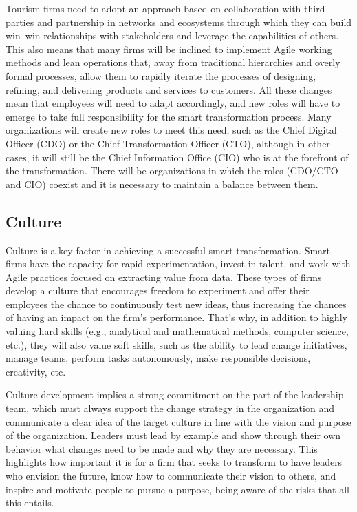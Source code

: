 \documentclass[
  letterpaper,
  DIV=11,
  numbers=noendperiod]{scrreprt}
\begin{document}
Tourism firms need to adopt an approach based on collaboration with
third parties and partnership in networks and ecosystems through which
they can build win--win relationships with stakeholders and leverage the
capabilities of others. This also means that many firms will be inclined
to implement Agile working methods and lean operations that, away from
traditional hierarchies and overly formal processes, allow them to
rapidly iterate the processes of designing, refining, and delivering
products and services to customers. All these changes mean that
employees will need to adapt accordingly, and new roles will have to
emerge to take full responsibility for the smart transformation process.
Many organizations will create new roles to meet this need, such as the
Chief Digital Officer (CDO) or the Chief Transformation Officer (CTO),
although in other cases, it will still be the Chief Information Office
(CIO) who is at the forefront of the transformation. There will be
organizations in which the roles (CDO/CTO and CIO) coexist and it is
necessary to maintain a balance between them.

\hypertarget{culture}{%
\subsection{Culture}\label{culture}}

Culture is a key factor in achieving a successful smart transformation.
Smart firms have the capacity for rapid experimentation, invest in
talent, and work with Agile practices focused on extracting value from
data. These types of firms develop a culture that encourages freedom to
experiment and offer their employees the chance to continuously test new
ideas, thus increasing the chances of having an impact on the firm's
performance. That's why, in addition to highly valuing hard skills
(e.g., analytical and mathematical methods, computer science, etc.),
they will also value soft skills, such as the ability to lead change
initiatives, manage teams, perform tasks autonomously, make responsible
decisions, creativity, etc.

Culture development implies a strong commitment on the part of the
leadership team, which must always support the change strategy in the
organization and communicate a clear idea of the target culture in line
with the vision and purpose of the organization. Leaders must lead by
example and show through their own behavior what changes need to be made
and why they are necessary. This highlights how important it is for a
firm that seeks to transform to have leaders who envision the future,
know how to communicate their vision to others, and inspire and motivate
people to pursue a purpose, being aware of the risks that all this
entails.
\end{document}
